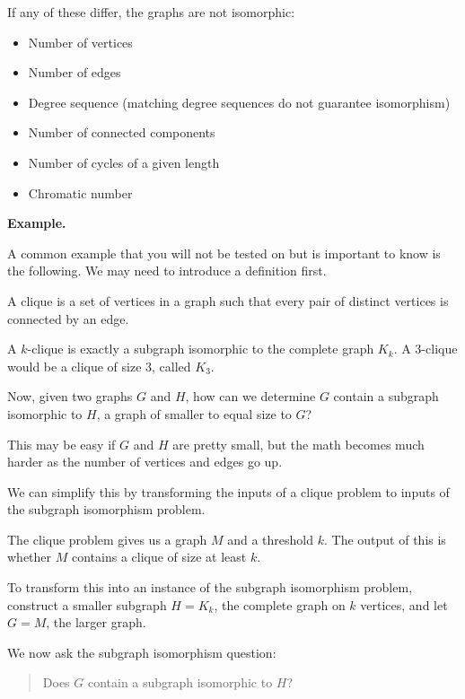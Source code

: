 If any of these differ, the graphs are not isomorphic:

\begin{itemize}
	\item Number of vertices
	\item Number of edges
	\item Degree sequence (matching degree sequences do not guarantee isomorphism)
	\item Number of connected components
	\item Number of cycles of a given length
	\item Chromatic number
\end{itemize}

\textbf{Example.}

A common example that you will not be tested on but is important to know is the following. We may need to introduce a definition first.
\begin{definition}[Clique]
	A clique is a set of vertices in a graph such that every pair of distinct vertices is connected by an edge.
\end{definition}
\begin{definition}
	A $k$-clique is exactly a subgraph isomorphic to the complete graph $K_k$. A 3-clique would be a clique of size 3, called $K_3$.
\end{definition}

Now, given two graphs $G$ and $H$, how can we determine $G$ contain a subgraph isomorphic to $H$, a graph of smaller to equal size to $G$?

This may be easy if $G$ and $H$ are pretty small, but the math becomes much harder as the number of vertices and edges go up.

We can simplify this by transforming the inputs of a clique problem to inputs of the subgraph isomorphism problem.

The clique problem gives us a graph $M$ and a threshold $k$. The output of this is whether $M$ contains a clique of size at least $k$.

To transform this into an instance of the subgraph isomorphism problem, construct a smaller subgraph $H = K_k$, the complete graph on $k$ vertices, and let $G = M$, the larger graph.

We now ask the subgraph isomorphism question:

\begin{quote}
	Does $G$ contain a subgraph isomorphic to $H$?
\end{quote}

